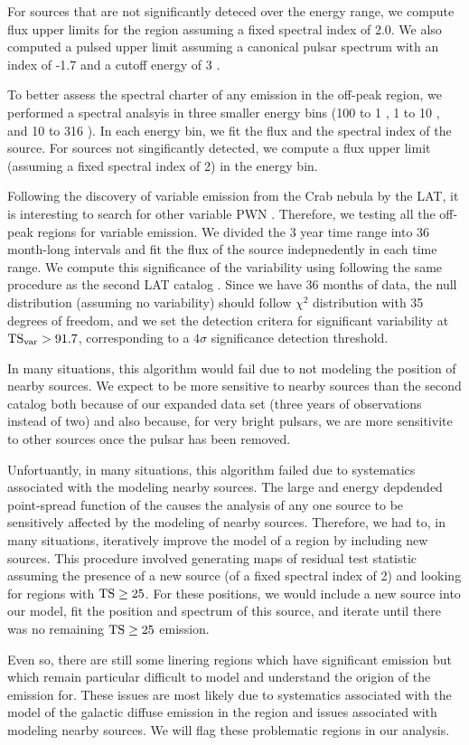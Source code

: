 For sources that are not significantly deteced over the energy range,
we compute flux upper limits for the region assuming a fixed spectral
index of 2.0.  We also computed a pulsed upper limit assuming a canonical
pulsar spectrum with an index of -1.7 and a cutoff energy of 3 \gev.

To better assess the spectral charter of any emission in the off-peak
region, we performed a spectral analsyis in three smaller energy bins
(100 \mev to 1 \gev, 1 \gev to 10 \gev, and 10 \gev to 316 \gev). In each
energy bin, we fit the flux and the spectral index of the source. For
sources not singificantly detected, we compute a flux upper limit
(assuming a fixed spectral index of 2) in the energy bin.


Following the discovery of variable emission from the Crab nebula
by the LAT, it is interesting to search for other variable PWN
\citep{LAT_Collaboration_Crab_Flare_2011}.  Therefore, we testing all the
off-peak regions for variable emission.  We divided the 3 year time range
into 36 month-long intervals and fit the flux of the source indepnedently
in each time range. We compute this significance of the variability
using \tsvar following the same procedure as the second LAT catalog
\citep{LAT_Collaboration_2FGL_2012}.  Since we have 36 months of data,
the null distribution (assuming no variability) should follow $\chi^2$
distribution with 35 degrees of freedom, and we set the detection critera
for significant variability at $\text{TS}_\text{var}>91.7$, corresponding to a $4\sigma$
significance detection threshold.

In many situations, this algorithm would fail due to not modeling the
position of nearby sources. We expect to be more sensitive to nearby
sources than the second \lat catalog both because of our expanded data
set (three years of observations instead of two) and also because, for
very bright pulsars, we are more sensitivite to other sources once the
pulsar has been removed.

Unfortuantly, in many situations, this algorithm failed due to
systematics associated with the modeling nearby sources. The large and
energy depdended point-spread function of the \lat causes the analysis
of any one source to be sensitively affected by the modeling of nearby
sources. Therefore, we had to, in many situations, iteratively improve
the model of a region by including new sources. This procedure 
involved generating maps of residual test statistic assuming the
presence of a new source (of a fixed spectral index of 2) and looking
for regions with $\text{TS}\ge25$.  For these positions, we would include a
new source into our model, fit the position and spectrum of this source,
and iterate until there was no remaining $\text{TS}\ge25$ emission.

Even so, there are still some linering regions which have significant
emission but which remain particular difficult to model and understand
the origion of the emission for.  These issues are most likely due to
systematics associated with the model of the galactic diffuse emission
in the region and issues associated with modeling nearby sources. We
will flag these problematic regions in our analysis.

